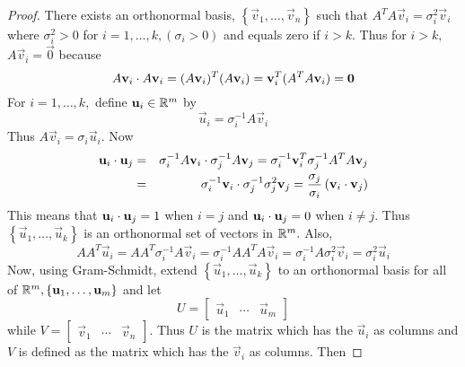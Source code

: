 \documentclass{ximera}
\begin{document}
\begin{proof}
There exists an orthonormal basis, $\left\{ \vec{v}_{1}, \dots, \vec{v}_n\right\}$ such that $
A^TA\vec{v}_{i}=\sigma _{i}^{2}\vec{v}_{i}$ where $\sigma
_{i}^{2}>0$ for $i=1,\dots ,k,\left( \sigma _{i}>0\right) $ and equals zero
if $i>k.$ Thus for $i>k,$ $A\vec{v}_{i}=\vec{0}$ because
\begin{equation*}
 A\mathbf{v}_{i}\cdot A\mathbf{v}_{i} = (A\mathbf{v}_i)^T(A\mathbf{v}_i)=\mathbf{v}_i^T(A^TA\mathbf{v}_i)=\mathbf{0}
\end{equation*}
For $i=1,\dots ,k,$ define $\mathbf{u}_{i}\in \mathbb{R}^{m}$ by
\begin{equation*}
\vec{u}_{i}= \sigma _{i}^{-1}A\vec{v}_{i}
\end{equation*}
Thus $A\vec{v}_{i}=\sigma _{i}\vec{u}_{i}.$ Now
\begin{eqnarray*}
\vec{u}_{i} \dotp \vec{u}_{j} &=&  \sigma _{i}^{-1}A
\vec{v}_{i} \dotp \sigma _{j}^{-1}A\vec{v}_{j}  = \sigma_{i}^{-1}\vec{v}_{i}^T \sigma _{j}^{-1}A^TA\vec{v}_{j} \\
&=& \sigma _{i}^{-1}\vec{v}_{i} \dotp \sigma _{j}^{-1}\sigma _{j}^{2} \vec{v}_{j} =
\frac{\sigma _{j}}{\sigma _{i}}\left( \vec{v}_{i} \dotp \vec{v}_{j}\right)%
\end{eqnarray*}
This means that $\mathbf{u}_{i} \cdot \mathbf{u}_{j}=1$ when $i=j$ and $\mathbf{u}_{i} \cdot \mathbf{u}_{j}=0$ when $i\neq j$.
Thus $\left\{ \vec{u}_{1}, \dots, \vec{u}_{k}\right\}$ is an orthonormal set of
vectors in $\mathbb{R}^{m}.$ Also,
\begin{equation*}
AA^T\vec{u}_{i}=AA^T\sigma _{i}^{-1}A\vec{v}_{i}=\sigma
_{i}^{-1}AA^TA\vec{v}_{i}=\sigma _{i}^{-1}A\sigma _{i}^{2}\vec{v}
_{i}=\sigma _{i}^{2}\vec{u}_{i}
\end{equation*}
Now, using Gram-Schmidt, extend $\left\{ \vec{u}_{1}, \dots, \vec{u}_{k}\right\}$ to an orthonormal
basis for all of $\mathbb{R}^{m},\left\{ \mathbf{u}_{1},\dots,\mathbf{u}_{m}\right\}$
and let
\begin{equation*}
U= \left[
\begin{array}{ccc}
\vec{u}_{1} & \cdots & \vec{u}_{m}
\end{array}
\right]
\end{equation*}
while $V= \left[ \begin{array}{ccc} \vec{v}_{1} & \cdots & \vec{v}_{n}\end{array}\right] .$ Thus $U$
is the matrix which has the $\vec{u}_{i}$ as columns and $V$ is defined
as the matrix which has the $\vec{v}_{i}$ as columns. Then

\end{proof}
\end{document}
